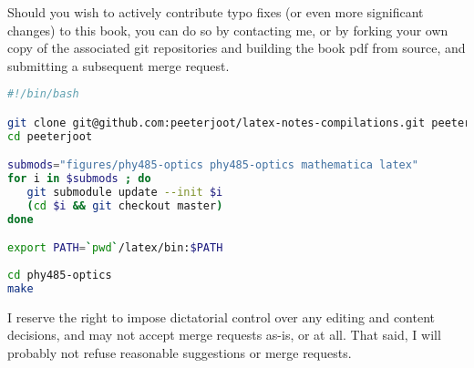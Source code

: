 %
%

Should you wish to actively contribute typo fixes (or even more significant changes) to this book, you can do so by contacting me, or by forking your own copy of the associated git repositories and building the book pdf from source, and submitting a subsequent merge request.

\begin{lstlisting}[language=bash]
#!/bin/bash

git clone git@github.com:peeterjoot/latex-notes-compilations.git peeterjoot
cd peeterjoot

submods="figures/phy485-optics phy485-optics mathematica latex"
for i in $submods ; do
   git submodule update --init $i
   (cd $i && git checkout master)
done

export PATH=`pwd`/latex/bin:$PATH
 
cd phy485-optics
make
\end{lstlisting}

I reserve the right to impose dictatorial control over any editing and content decisions, and may not accept merge requests as-is, or at all. That said, I will probably not refuse reasonable suggestions or merge requests.
